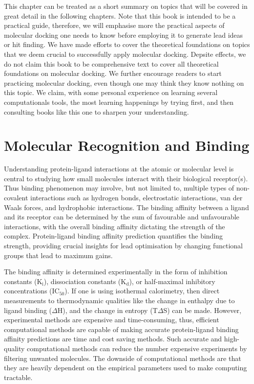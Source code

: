 \documentclass[12pt, a4paper]{article}
\begin{document}
This chapter can be treated as a short summary on topics that will be covered in great detail in the following chapters. Note that this book is intended to be a practical guide, therefore, we will emphasise more the practical aspects of molecular docking one needs to know before employing it to generate lead ideas or hit finding. We have made efforts to cover the theoretical foundations on topics that we deem crucial to successfully apply molecular docking. Depsite effects, we do not claim this book to be comprehensive text to cover all theoretical foundations on molecular docking. We further encourage readers to start practicing molecular docking, even though one may think they know nothing on this topic. We claim, with some personal experience on learning several computationals tools, the most learning happenings by trying first, and then consulting books like this one to sharpen your understanding. 

\section{Molecular Recognition and Binding}
Understanding protein-ligand interactions at the atomic or molecular level is central to studying how small molecules interact with their biological receptor(s). Thus binding phenomenon may involve, but not limited to, multiple types of non-covalent interactions such as hydrogen bonds, electrostatic interactions, van der Waals forces, and hydrophobic interactions. The binding affinity between a ligand and its receptor can be determined by the sum of favourable and unfavourable interactions, with the overall binding affinity dictating the strength of the complex. Protein-ligand binding affinity prediction quantifies the binding strength, providing crucial insights for lead optimisation by changing functional groups that lead to maximum gains\cite{CH1_13}. 

The binding affinity is determined experimentally in the form of inhibition constants (K$_\text{i}$), dissociation constants (K$_\text{d}$), or half-maximal inhibitory concentrations (IC$_\text{50}$). If one is using isothermal calorimetry, then direct measurements to thermodynamic qualities like the change in enthalpy due to ligand binding ({$\Delta$}H), and the change in entropy (T{$\Delta$}S) can be made. However, experimental methods are expensive and time-consuming, thus, efficient computational methods are capable of making accurate protein-ligand binding affinity predictions are time and cost saving methods. Such accurate and high-quality computational methods can reduce the number expensive experiments by filtering unwanted molecules. The downside of computational methods are that they are heavily dependent on the empirical parameters used to make computing tractable.
\end{document}
